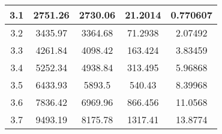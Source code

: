 \begin{table}[h!]
\begin{tabular}{|c|c|c|c|c|}
        3.1 & 2751.26 & 2730.06                             & 21.2014       & 0.770607              \\ \hline
        3.2 & 3435.97 & 3364.68                             & 71.2938       & 2.07492               \\ \hline
        3.3 & 4261.84 & 4098.42                             & 163.424       & 3.83459               \\ \hline
        3.4 & 5252.34 & 4938.84                             & 313.495       & 5.96868               \\ \hline
        3.5 & 6433.93 & 5893.5                              & 540.43        & 8.39968               \\ \hline
        3.6 & 7836.42 & 6969.96                             & 866.456       & 11.0568               \\ \hline
        3.7 & 9493.19 & 8175.78                             & 1317.41       & 13.8774               \\ \hline
    \end{tabular}\label{tab:table6}
\end{table}
